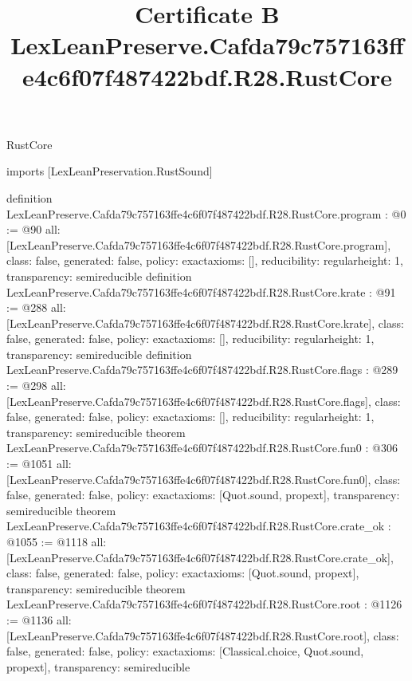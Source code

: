 \begin{lexlean}{RustCore}
\title{Certificate B LexLeanPreserve.Cafda79c757163ffe4c6f07f487422bdf.R28.RustCore}
\begin{coremodule}
imports [LexLeanPreservation.RustSound]

definition LexLeanPreserve.Cafda79c757163ffe4c6f07f487422bdf.R28.RustCore.program : @0 := @90 {
  all: [LexLeanPreserve.Cafda79c757163ffe4c6f07f487422bdf.R28.RustCore.program],
  class: false,
  generated: false,
  policy: exact{axioms: []},
  reducibility: regular{height: 1},
  transparency: semireducible
}
definition LexLeanPreserve.Cafda79c757163ffe4c6f07f487422bdf.R28.RustCore.krate : @91 := @288 {
  all: [LexLeanPreserve.Cafda79c757163ffe4c6f07f487422bdf.R28.RustCore.krate],
  class: false,
  generated: false,
  policy: exact{axioms: []},
  reducibility: regular{height: 1},
  transparency: semireducible
}
definition LexLeanPreserve.Cafda79c757163ffe4c6f07f487422bdf.R28.RustCore.flags : @289 := @298 {
  all: [LexLeanPreserve.Cafda79c757163ffe4c6f07f487422bdf.R28.RustCore.flags],
  class: false,
  generated: false,
  policy: exact{axioms: []},
  reducibility: regular{height: 1},
  transparency: semireducible
}
theorem LexLeanPreserve.Cafda79c757163ffe4c6f07f487422bdf.R28.RustCore.fun0 : @306 := @1051 {
  all: [LexLeanPreserve.Cafda79c757163ffe4c6f07f487422bdf.R28.RustCore.fun0],
  class: false,
  generated: false,
  policy: exact{axioms: [Quot.sound, propext]},
  transparency: semireducible
}
theorem LexLeanPreserve.Cafda79c757163ffe4c6f07f487422bdf.R28.RustCore.crate_ok : @1055 := @1118 {
  all: [LexLeanPreserve.Cafda79c757163ffe4c6f07f487422bdf.R28.RustCore.crate_ok],
  class: false,
  generated: false,
  policy: exact{axioms: [Quot.sound, propext]},
  transparency: semireducible
}
theorem LexLeanPreserve.Cafda79c757163ffe4c6f07f487422bdf.R28.RustCore.root : @1126 := @1136 {
  all: [LexLeanPreserve.Cafda79c757163ffe4c6f07f487422bdf.R28.RustCore.root],
  class: false,
  generated: false,
  policy: exact{axioms: [Classical.choice, Quot.sound, propext]},
  transparency: semireducible
}


\end{coremodule}
\end{lexlean}
